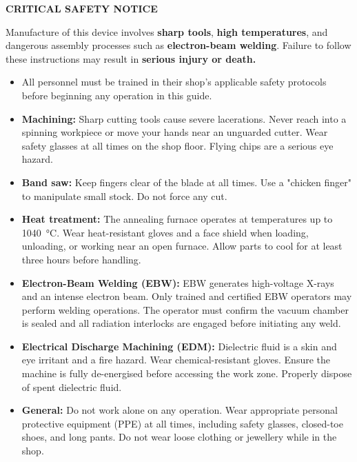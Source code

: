 \documentclass[12pt, letterpaper]{report}%
\begin{document}
\begin{warningbox}
	\textbf{\large \textcolor{warnred}{CRITICAL SAFETY NOTICE}}

	\medskip
	Manufacture of this device involves \textbf{sharp tools}, \textbf{high temperatures},
	and dangerous assembly processes such as \textbf{electron-beam welding}.
	Failure to follow these instructions may result in \textbf{serious injury or death.}

	\medskip
	\begin{itemize}[leftmargin=1.5em, itemsep=2pt]
		\item All personnel must be trained in their shop's applicable safety protocols before
					beginning any operation in this guide.
		\item \textbf{Machining:} Sharp cutting tools cause severe lacerations. Never reach into
					a spinning workpiece or move your hands near an unguarded cutter. Wear safety
					glasses at all times on the shop floor. Flying chips are a serious eye hazard.
		\item \textbf{Band saw:} Keep fingers clear of the blade at all times. Use a "chicken finger"
					to manipulate small stock. Do not force any cut.
		\item \textbf{Heat treatment:} The annealing furnace operates at temperatures up to
					\SI{1040}{\degreeCelsius}. Wear heat-resistant gloves and a face shield when
					loading, unloading, or working near an open furnace.
					Allow parts to cool for at least three hours before handling.
		\item \textbf{Electron-Beam Welding (EBW):} EBW generates high-voltage X-rays and an
					intense electron beam. Only trained and certified EBW operators may perform
					welding operations. The operator must confirm the vacuum chamber is sealed and
					all radiation interlocks are engaged before initiating any weld.
	\end{itemize}
\end{warningbox}
\newpage
\begin{warningbox}
	\begin{itemize}[leftmargin=1.5em, itemsep=2pt]
		\item \textbf{Electrical Discharge Machining (EDM):} Dielectric fluid is a skin and
					eye irritant and a fire hazard. Wear chemical-resistant gloves. Ensure the machine
					is fully de-energised before accessing the work zone. Properly dispose of spent
					dielectric fluid.
		\item \textbf{General:} Do not work alone on any operation. Wear
					appropriate personal protective equipment (PPE) at all times, including safety glasses, closed-toe shoes, 
					and long pants.
					Do not wear loose clothing or jewellery while in the shop.
	\end{itemize}
\end{warningbox}
\end{document}
